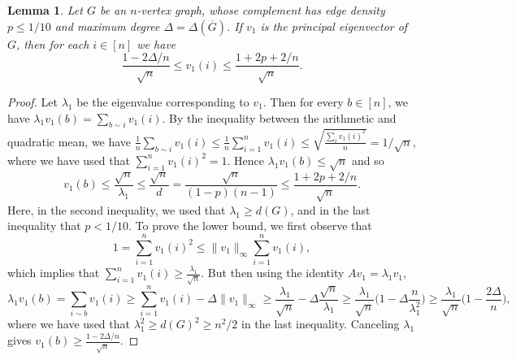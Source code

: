 \documentclass[11pt]{article}
\theoremstyle{plain}
\newtheorem{lemma}[theorem]{Lemma}
\theoremstyle{definition}
\begin{document}
\begin{lemma}\label{lemma:max_entry}
Let $G$ be an $n$-vertex graph, whose complement has edge density $p\leq 1/10$ and maximum degree $\Delta=\Delta(\overline{G})$. If $v_1$ is the principal eigenvector of $G$, then for each $i\in [n]$ we have \[\frac{1-2\Delta/n}{\sqrt{n}} \leq v_1(i)\leq \frac{1+2p+2/n}{\sqrt{n}}.\]
\end{lemma}
\begin{proof}
Let $\lambda_1$ be the eigenvalue corresponding to $v_1$. Then for every $b\in [n]$, we have $\lambda_1v_1(b)=\sum_{b\sim i}v_1(i)$. By the inequality between the arithmetic and quadratic mean, we have $\frac{1}{n}\sum_{b\sim i}v_1(i)\leq \frac{1}{n}\sum_{i=1}^n v_1(i)\leq \sqrt{\frac{\sum_i v_1(i)^2}{n}}=1/\sqrt{n}$, where we have used that $\sum_{i=1}^nv_1(i)^2=1$. Hence $\lambda_1v_1(b)\leq \sqrt{n}$ and so
$$v_1(b)\leq \frac{\sqrt{n}}{\lambda_1}\leq \frac{\sqrt{n}}{d}=\frac{\sqrt{n}}{(1-p)(n-1)}\leq \frac{1+2p+2/n}{\sqrt{n}}.$$
Here, in the second inequality, we used that $\lambda_1\geq d(G)$, and in the last inequality that $p<1/10$. To prove the lower bound, we first observe that 
$$1=\sum_{i=1}^n v_1(i)^2\leq \|v_1\|_{\infty} \sum_{i=1}^n v_1(i),$$
which implies that $\sum_{i=1}^nv_1(i)\geq \frac{\lambda_1}{\sqrt{n}}$. But then using the identity $Av_1=\lambda_1 v_1$,
$$\lambda_1v_1(b)=\sum_{i\sim b}v_1(i)\geq \sum_{i=1}^nv_1(i)-\Delta \|v_1\|_{\infty}\geq\frac{\lambda_1}{\sqrt{n}}-\Delta\frac{\sqrt{n}}{\lambda_1}\geq \frac{\lambda_1}{\sqrt{n}}\Big(1-\Delta\frac{n}{\lambda_1^2}\Big)\geq \frac{\lambda_1}{\sqrt{n}}\Big(1-\frac{2\Delta}{n}\Big),$$
where we have used that $\lambda_1^2\geq d(G)^2\geq n^2/2$ in the last inequality. Canceling $\lambda_1$ gives $v_1(b)\geq \frac{1-2\Delta/n}{\sqrt{n}}$.
\end{proof}
\end{document}
